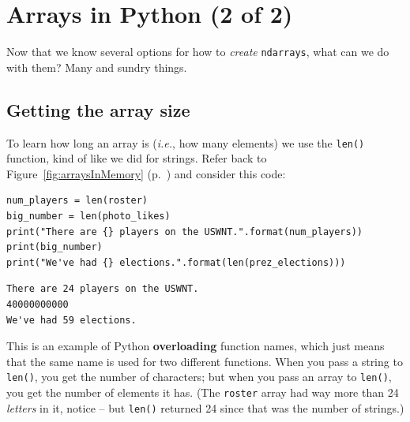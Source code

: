 


\chapter{Arrays in Python (2 of 2)}
\label{ch:arraysInPython2}


Now that we know several options for how to \textit{create} \texttt{ndarrays},
what can we do with them? Many and sundry things.

\section{Getting the array size}

To learn how long an array is (\textit{i.e.}, how many elements) we use the
\texttt{len()} function, kind of like we did for strings. Refer back to
Figure~\ref{fig:arraysInMemory} (p.~\pageref{fig:arraysInMemory}) and consider
this code:

\begin{Verbatim}[fontsize=\footnotesize,samepage=true,frame=single,framesep=3mm]
num_players = len(roster)
big_number = len(photo_likes)
print("There are {} players on the USWNT.".format(num_players))
print(big_number)
print("We've had {} elections.".format(len(prez_elections)))
\end{Verbatim}

\begin{Verbatim}[fontsize=\footnotesize,samepage=true,frame=single,framesep=3mm]
There are 24 players on the USWNT.
40000000000
We've had 59 elections.
\end{Verbatim}

This is an example of Python \textbf{overloading} function names, which just
means that the same name is used for two different functions. When you pass a
string to \texttt{len()}, you get the number of characters; but when you pass
an array to \texttt{len()}, you get the number of elements it has.
(The \texttt{roster} array had way more than 24 \textit{letters} in it, notice
-- but \texttt{len()} returned 24 since that was the number of strings.)

